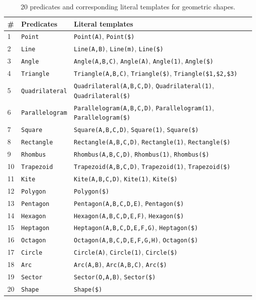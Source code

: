 

\begin{table}[ht]
\centering 
\footnotesize
\begin{tabular}{lll}
	\toprule
	\# & \textbf{Predicates} & \textbf{Literal templates} \\
	\midrule
	1 & \texttt{Point} & \texttt{Point(A)}, \texttt{Point(\$)} \\
	2 & \texttt{Line} & \texttt{Line(A,B)}, \texttt{Line(m)}, \texttt{Line(\$)} \\
	3 & \texttt{Angle} & \texttt{Angle(A,B,C)}, \texttt{Angle(A)}, \texttt{Angle(1)}, \texttt{Angle(\$)} \\
	4 & \texttt{Triangle} & \texttt{Triangle(A,B,C)}, \texttt{Triangle(\$)}, \texttt{Triangle(\$1,\$2,\$3)} \\
	5 & \texttt{Quadrilateral} & \texttt{Quadrilateral(A,B,C,D)}, \texttt{Quadrilateral(1)}, \texttt{Quadrilateral(\$)} \\
	6 & \texttt{Parallelogram} & \texttt{Parallelogram(A,B,C,D)}, \texttt{Parallelogram(1)}, \texttt{Parallelogram(\$)} \\
	7 & \texttt{Square} & \texttt{Square(A,B,C,D)}, \texttt{Square(1)}, \texttt{Square(\$)} \\
	8 & \texttt{Rectangle} & \texttt{Rectangle(A,B,C,D)}, \texttt{Rectangle(1)}, \texttt{Rectangle(\$)} \\
	9 & \texttt{Rhombus} & \texttt{Rhombus(A,B,C,D)}, \texttt{Rhombus(1)}, \texttt{Rhombus(\$)} \\
	10 & \texttt{Trapezoid} & \texttt{Trapezoid(A,B,C,D)}, \texttt{Trapezoid(1)}, \texttt{Trapezoid(\$)} \\
	11 & \texttt{Kite} & \texttt{Kite(A,B,C,D)}, \texttt{Kite(1)}, \texttt{Kite(\$)} \\
	12 & \texttt{Polygon} & \texttt{Polygon(\$)} \\
	13 & \texttt{Pentagon} & \texttt{Pentagon(A,B,C,D,E)}, \texttt{Pentagon(\$)} \\
	14 & \texttt{Hexagon} & \texttt{Hexagon(A,B,C,D,E,F)}, \texttt{Hexagon(\$) }\\
	15 & \texttt{Heptagon} & \texttt{Heptagon(A,B,C,D,E,F,G)}, \texttt{Heptagon(\$)} \\
	16 & \texttt{Octagon} & \texttt{Octagon(A,B,C,D,E,F,G,H)}, \texttt{Octagon(\$)} \\
	17 & \texttt{Circle} & \texttt{Circle(A)}, \texttt{Circle(1)}, \texttt{Circle(\$)} \\
	18 & \texttt{Arc} & 	\texttt{Arc(A,B)}, \texttt{Arc(A,B,C)}, \texttt{Arc(\$)} \\
	19 & \texttt{Sector} & 	\texttt{Sector(O,A,B)}, \texttt{Sector(\$)} \\
	20 & \texttt{Shape} & 	\texttt{Shape(\$)}\\
	\bottomrule
\end{tabular}
\caption{20 predicates and corresponding literal templates for geometric shapes.} 
\label{appex:predicate1}
\end{table}

